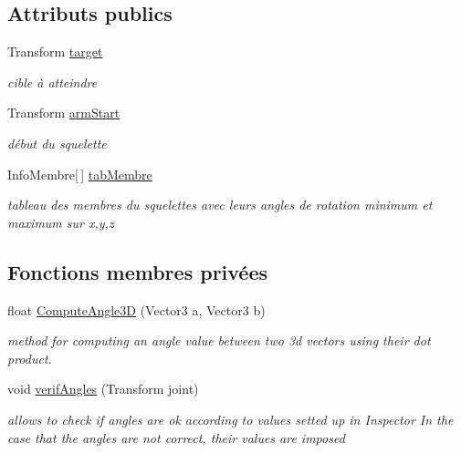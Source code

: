 \subsection*{Attributs publics}
\begin{DoxyCompactItemize}
\item 
\hypertarget{class_c_c_d3d_a8a24b37582e07ee23646b165d54fa600}{Transform \hyperlink{class_c_c_d3d_a8a24b37582e07ee23646b165d54fa600}{target}}\label{class_c_c_d3d_a8a24b37582e07ee23646b165d54fa600}

\begin{DoxyCompactList}\small\item\em cible à atteindre \end{DoxyCompactList}\item 
\hypertarget{class_c_c_d3d_a2eead529af518997fa586c6a009cfa77}{Transform \hyperlink{class_c_c_d3d_a2eead529af518997fa586c6a009cfa77}{arm\+Start}}\label{class_c_c_d3d_a2eead529af518997fa586c6a009cfa77}

\begin{DoxyCompactList}\small\item\em début du squelette \end{DoxyCompactList}\item 
\hypertarget{class_c_c_d3d_a122c5917b76f173bf2d412149c2e93c5}{Info\+Membre\mbox{[}$\,$\mbox{]} \hyperlink{class_c_c_d3d_a122c5917b76f173bf2d412149c2e93c5}{tab\+Membre}}\label{class_c_c_d3d_a122c5917b76f173bf2d412149c2e93c5}

\begin{DoxyCompactList}\small\item\em tableau des membres du squelettes avec leurs angles de rotation minimum et maximum sur x,y,z \end{DoxyCompactList}\end{DoxyCompactItemize}
\subsection*{Fonctions membres privées}
\begin{DoxyCompactItemize}
\item 
float \hyperlink{class_c_c_d3d_a921e61de2ab1ce035bd7ebf1d7e7e1a1}{Compute\+Angle3\+D} (Vector3 a, Vector3 b)
\begin{DoxyCompactList}\small\item\em method for computing an angle value between two 3d vectors using their dot product. \end{DoxyCompactList}\item 
void \hyperlink{class_c_c_d3d_a9b67671b0dc9adb1577328732185447a}{verif\+Angles} (Transform joint)
\begin{DoxyCompactList}\small\item\em allows to check if angles are ok according to values setted up in Inspector In the case that the angles are not correct, their values are imposed \end{DoxyCompactList}\end{DoxyCompactItemize}


